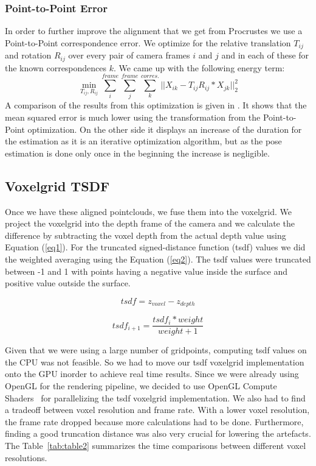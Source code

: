 \documentclass[10pt,twocolumn,letterpaper]{article}
\begin{document}
\subsubsection{Point-to-Point Error}
In order to further improve the alignment that we get from Procrustes we use a Point-to-Point correspondence error. We optimize for the relative translation $T_{ij}$ and rotation $R_{ij}$ over every pair of camera frames $i$ and $j$ and in each of these for the known correspondences $k$. We came up with the following energy term:
\begin{equation}\label{eq5}
\min_{T_{ij}, R_{ij}} \sum_{i}^{frame}\sum_{j}^{frame}\sum_{k}^{corres.} || X_{ik} - T_{ij}R_{ij}*X_{jk} ||_2^2
\end{equation}
A comparison of the results from this optimization is given in . It shows that the mean squared error is much lower using the transformation from the Point-to-Point optimization. On the other side it displays an increase of the duration for the estimation as it is an iterative optimization algorithm, but as the pose estimation is done only once in the beginning the increase is negligible.
\subsection{Voxelgrid TSDF}
Once we have these aligned pointclouds, we fuse them into the voxelgrid. We project the voxelgrid into the depth frame of the camera and we calculate the difference by subtracting the voxel depth from the actual depth value using Equation (\ref{eq1}). For the truncated signed-distance function (tsdf) values we did the weighted averaging using the Equation (\ref{eq2}). The tsdf values were truncated between -1 and 1 with points having a negative value inside the surface and positive value outside the surface.

\begin{equation}\label{eq1}
tsdf=z_{voxel} - z_{depth}
\end{equation}

\begin{equation}\label{eq2}
tsdf_{i+1}=\frac{tsdf_{i} * weight}{weight+1}
\end{equation}

Given that we were using a large number of gridpoints, computing tsdf values on the CPU was not feasible. So we had to move our tsdf voxelgrid implementation onto the GPU inorder to achieve real time results. Since we were already using OpenGL for the rendering pipeline, we decided to use OpenGL Compute Shaders~\cite{Authors1} for parallelizing the tsdf voxelgrid implementation. We also had to find a tradeoff between voxel resolution and frame rate. With a lower voxel resolution, the frame rate dropped because more calculations had to be done. Furthermore, finding a good truncation distance was also very crucial for lowering the artefacts. The Table~\ref{tab:table2} summarizes the time comparisons between different voxel resolutions.
\end{document}
